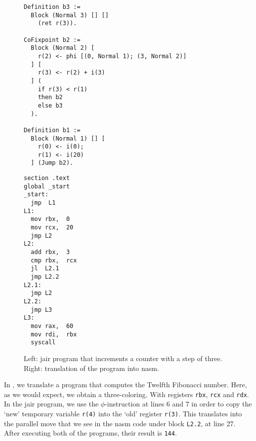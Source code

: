 \begin{figure}[ht]
\begin{minipage}{0.68\linewidth}
\centering
\begin{lstlisting}[style=Rocq]
Definition b3 :=
  Block (Normal 3) [] []
    (ret r(3)).

CoFixpoint b2 :=
  Block (Normal 2) [
    r(2) <- phi [(0, Normal 1); (3, Normal 2)]
  ] [
    r(3) <- r(2) + i(3)
  ] (
    if r(3) < r(1)
    then b2
    else b3
  ).

Definition b1 :=
  Block (Normal 1) [] [
    r(0) <- i(0);
    r(1) <- i(20)
  ] (Jump b2).
\end{lstlisting}
\end{minipage}
\hfill
\begin{minipage}{0.28\linewidth}
\centering
\begin{lstlisting}[style=NASM]
section .text
global _start
_start:
  jmp  L1
L1:
  mov rbx,  0
  mov rcx,  20
  jmp L2
L2:
  add rbx,  3
  cmp rbx,  rcx
  jl  L2.1
  jmp L2.2
L2.1:
  jmp L2
L2.2:
  jmp L3
L3:
  mov rax,  60
  mov rdi,  rbx
  syscall
\end{lstlisting}
\end{minipage}
\caption{Left: \gls{jair} program that increments a counter with a step of three. Right: translation of the program into \gls{nasm}.}
\label{fig:ex2}
\end{figure}

In , we translate a program that computes the Twelfth Fibonacci number. Here, as we would expect, we obtain a three-coloring. With registers \texttt{rbx}, \texttt{rcx} and \texttt{rdx}. In the \gls{jair} program, we use the $\phi$-instruction at lines 6 and 7 in order to copy the `new' temporary variable \texttt{r(4)} into the `old' register \texttt{r(3)}. This translates into the parallel move that we see in the \gls{nasm} code under block \texttt{L2.2}, at line 27. After executing both of the programs, their result is \texttt{144}.

